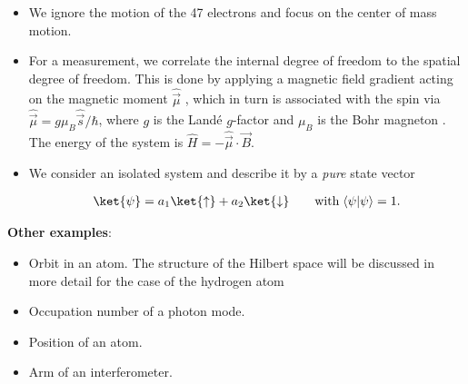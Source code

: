 \begin{itemize}
						\item 	We ignore the motion of the 47 electrons and focus on the center of mass motion.
						\item 	For a measurement, we correlate the internal degree of freedom to the spatial degree of freedom. This is done by applying a magnetic field gradient acting on the magnetic moment $\hat{\vec{\mu}}$ , which in turn is associated with the spin via $\hat{\vec{\mu}} = g \mu_B \hat{\vec{s}}/\hbar$, where $g$ is the Landé $g$-factor  and $\mu_B$ is the Bohr magneton . The energy of the system is $\hat{H} = -\hat{\vec{\mu}} \cdot \vec{B}$.
						\item 	We consider an isolated system and describe it by a \emph{pure} state vector

\begin{align}
	\ket{\psi} = a_1 \ket{\uparrow} + a_2 \ket{\downarrow}  \qquad \text{with} \; \langle\psi | \psi\rangle = 1.
\end{align}
\end{itemize}
\textbf{Other examples}:
\begin{itemize}
\item Orbit in an atom. The structure of the Hilbert space will be discussed in more detail for the case of the hydrogen atom
\item Occupation number of a photon mode.
\item Position of an atom.
\item Arm of an interferometer.
\end{itemize}

